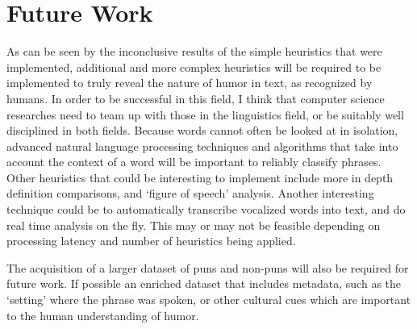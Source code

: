 \section{Future Work}
As can be seen by the inconclusive results of the simple heuristics that were implemented, additional and more complex heuristics will be required to be implemented to truly reveal the nature of humor in text, as recognized by humans. In order to be successful in this field, I think that computer science researches need to team up with those in the linguistics field, or be suitably well disciplined in both fields. Because words cannot often be looked at in isolation, advanced natural language processing techniques and algorithms that take into account the context of a word will be important to reliably classify phrases. Other heuristics that could be interesting to implement include more in depth definition comparisons, and `figure of speech' analysis.
Another interesting technique could be to automatically transcribe vocalized words into text, and do real time analysis on the fly. This may or may not be feasible depending on processing latency and number of heuristics being applied.

The acquisition of a larger dataset of puns and non-puns will also be required for future work. If possible an enriched dataset that includes metadata, such as the `setting' where the phrase was spoken, or other cultural cues which are important to the human understanding of humor.